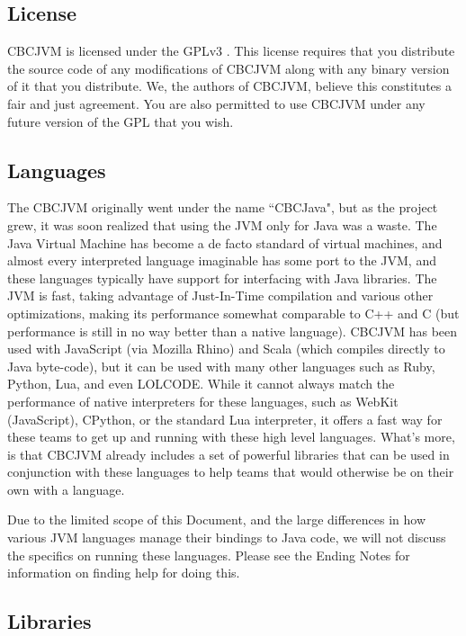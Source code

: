 \documentclass[12pt,letterpaper]{article}
\begin{document}
\subsection{License}

CBCJVM is licensed under the GPLv3 \cite{gpl3}. This license requires that you distribute the source code of any modifications of CBCJVM along with any binary version of it that you distribute. We, the authors of CBCJVM, believe this constitutes a fair and just agreement. You are also permitted to use CBCJVM under any future version of the GPL that you wish.



\subsection{Languages}

The CBCJVM originally went under the name ``CBCJava", but as the project grew, it was soon realized that using the JVM only for Java was a waste. The Java Virtual Machine has become a de facto standard of virtual machines, and almost every interpreted language imaginable has some port to the JVM, and these languages typically have support for interfacing with Java libraries. The JVM is fast, taking advantage of Just-In-Time compilation and various other optimizations, making its performance somewhat comparable to C++ and C (but performance is still in no way better than a native language). CBCJVM has been used with JavaScript (via Mozilla Rhino) and Scala (which compiles directly to Java byte-code), but it can be used with many other languages such as Ruby, Python, Lua, and even LOLCODE. While it cannot always match the performance of native interpreters for these languages, such as WebKit (JavaScript), CPython, or the standard Lua interpreter, it offers a fast way for these teams to get up and running with these high level languages. What's more, is that CBCJVM already includes a set of powerful libraries that can be used in conjunction with these languages to help teams that would otherwise be on their own with a language.

Due to the limited scope of this Document, and the large differences in how various JVM languages manage their bindings to Java code, we will not discuss the specifics on running these languages. Please see the Ending Notes for information on finding help for doing this.



\subsection{Libraries}
\end{document}
